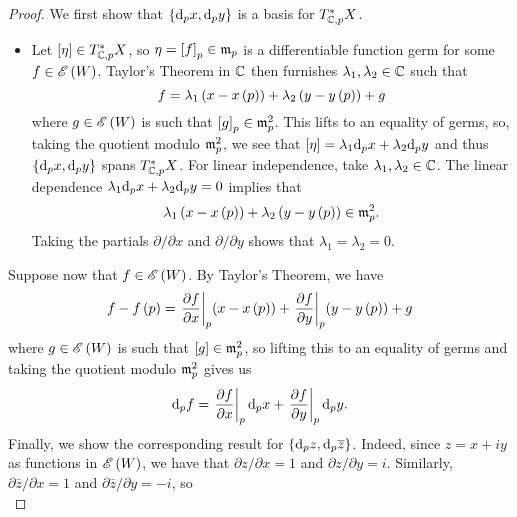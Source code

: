\documentclass[../Moduli_Spaces_of_Riemann_Surfaces.tex]{subfiles}
\begin{document}
    \begin{proof}
        We first show that $\left\{\mathrm{d}_px,\mathrm{d}_py\right\}$ is a basis for $T_{\mathbb{C},p}^\ast X$.
        \begin{itemize}
            \item Let $\left[\eta\right]\in T_{\mathbb{C},p}^\ast X$, so $\eta=\left[f\right]_p\in\mathfrak{m}_p$ is a differentiable function germ for some $f\in\mathscr{E}\left(W\right)$. Taylor's Theorem in $\mathbb{C}$ then furnishes $\lambda_1,\lambda_2\in\mathbb{C}$ such that
                \begin{equation*}
                    f=\lambda_1\left(x-x\left(p\right)\right)+\lambda_2\left(y-y\left(p\right)\right)+g
                \end{equation*}
                where $g\in\mathscr{E}\left(W\right)$ is such that $\left[g\right]_p\in\mathfrak{m}^2_p$. This lifts to an equality of germs, so, taking the quotient modulo $\mathfrak{m}^2_p$, we see that $\left[\eta\right]=\lambda_1\mathrm{d}_px+\lambda_2\mathrm{d}_py$ and thus $\left\{\mathrm{d}_px,\mathrm{d}_py\right\}$ spans $T_{\mathbb{C},p}^\ast X$. For linear independence, take $\lambda_1,\lambda_2\in\mathbb{C}$. The linear dependence $\lambda_1\mathrm{d}_px+\lambda_2\mathrm{d}_py=0$ implies that
                \begin{equation*}
                    \lambda_1\left(x-x\left(p\right)\right)+\lambda_2\left(y-y\left(p\right)\right)\in\mathfrak{m}^2_p.
                \end{equation*}
                Taking the partials $\partial/\partial x$ and $\partial/\partial y$ shows that $\lambda_1=\lambda_2=0$.
        \end{itemize}
        Suppose now that $f\in\mathscr{E}\left(W\right)$. By Taylor's Theorem, we have
        \begin{equation*}
            f-f\left(p\right)=\left.\frac{\partial f}{\partial x}\right|_p\!\left(x-x\left(p\right)\right)+\left.\frac{\partial f}{\partial y}\right|_p\!\left(y-y\left(p\right)\right)+g
        \end{equation*}
        where $g\in\mathscr{E}\left(W\right)$ is such that $\left[g\right]\in\mathfrak{m}^2_p$, so lifting this to an equality of germs and taking the quotient modulo $\mathfrak{m}^2_p$ gives us
        \begin{equation*}
            \mathrm{d}_pf=\left.\frac{\partial f}{\partial x}\right|_p\mathrm{d}_px+\left.\frac{\partial f}{\partial y}\right|_p\mathrm{d}_py.
        \end{equation*}
        Finally, we show the corresponding result for $\left\{\mathrm{d}_pz,\mathrm{d}_p\overline{z}\right\}$. Indeed, since $z=x+iy$ as functions in $\mathscr{E}\left(W\right)$, we have that $\partial z/\partial x=1$ and $\partial z/\partial y=i$. Similarly, $\partial\bar{z}/\partial x=1$ and $\partial\bar{z}/\partial y=-i$, so
        \begin{equation*}

\end{equation*}
\end{proof}
\end{document}
